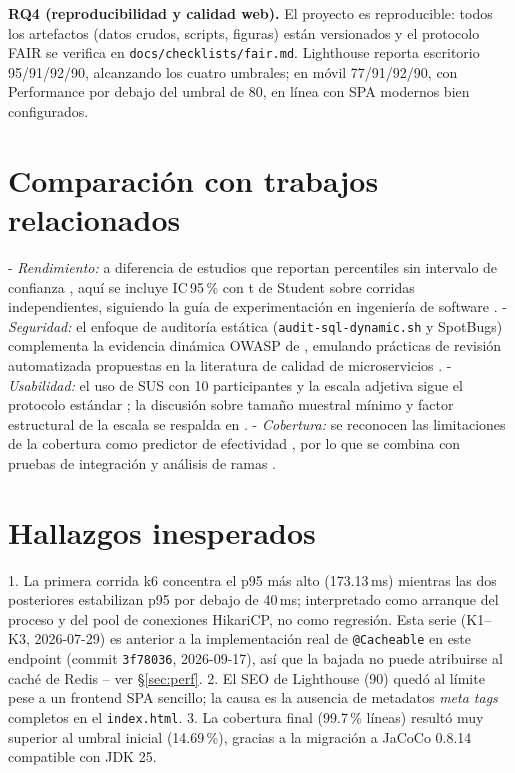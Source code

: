 \textbf{RQ4 (reproducibilidad y calidad web).} El proyecto es reproducible: todos
los artefactos (datos crudos, scripts, figuras) están versionados y el protocolo
FAIR se verifica en \texttt{docs/checklists/fair.md}. Lighthouse reporta escritorio
95/91/92/90, alcanzando los cuatro umbrales; en móvil 77/91/92/90, con Performance
por debajo del umbral de 80, en línea con SPA modernos bien configurados.

\section{Comparación con trabajos relacionados}

- \emph{Rendimiento:} a diferencia de estudios que reportan percentiles sin
  intervalo de confianza \cite{jiang2009}, aquí se incluye IC\,95\,\% con t de
  Student sobre corridas independientes, siguiendo la guía de experimentación en
  ingeniería de software \cite{wohlin2012}.
- \emph{Seguridad:} el enfoque de auditoría estática (\texttt{audit-sql-dynamic.sh}
  y SpotBugs) complementa la evidencia dinámica OWASP de \cite{owasp2021},
  emulando prácticas de revisión automatizada propuestas en la literatura de
  calidad de microservicios \cite{taibi2018}.
- \emph{Usabilidad:} el uso de SUS con 10 participantes y la escala adjetiva sigue
  el protocolo estándar \cite{brooke1996,bangor2009}; la discusión sobre tamaño
  muestral mínimo y factor estructural de la escala se respalda en \cite{lewis2009}.
- \emph{Cobertura:} se reconocen las limitaciones de la cobertura como predictor
  de efectividad \cite{inozemtseva2014}, por lo que se combina con pruebas de
  integración y análisis de ramas \cite{gopinath2014,gligoric2013,ivankovic2019}.

\section{Hallazgos inesperados}

1. La primera corrida k6 concentra el p95 más alto (173.13\,ms) mientras las dos
   posteriores estabilizan p95 por debajo de 40\,ms; interpretado como arranque del
   proceso y del pool de conexiones HikariCP, no como regresión. Esta serie
   (K1--K3, 2026-07-29) es anterior a la implementación real de
   \texttt{@Cacheable} en este endpoint (commit \texttt{3f78036},
   2026-09-17), así que la bajada no puede atribuirse al caché de Redis
   -- ver \S\ref{sec:perf}.
2. El SEO de Lighthouse (90) quedó al límite pese a un frontend SPA sencillo; la
   causa es la ausencia de metadatos \emph{meta tags} completos en el \texttt{index.html}.
3. La cobertura final (99.7\,\% líneas) resultó muy superior al umbral inicial
   (14.69\,\%), gracias a la migración a JaCoCo 0.8.14 compatible con JDK 25.

